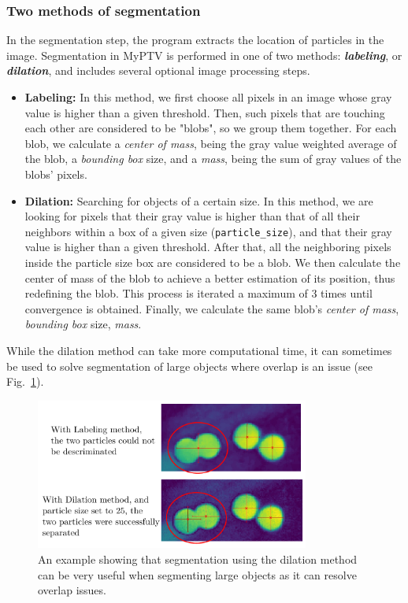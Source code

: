 \documentclass[10pt,a4paper]{article}
\begin{document}
\subsubsection{Two methods of segmentation} In the segmentation step, the program extracts the location of particles in the image. Segmentation in MyPTV is performed in one of two methods: \textbf{\textit{labeling}}, or \textbf{\textit{dilation}}, and includes several optional image processing steps. 
%
\begin{itemize}
	\item \textbf{Labeling:} In this method, we first choose all pixels in an image whose gray value is higher than a given threshold. Then, such pixels that are touching each other are considered to be "blobs", so we group them together. For each blob, we calculate a \textit{center of mass}, being the gray value weighted average of the blob, a \textit{bounding box} size, and a \textit{mass}, being the sum of gray values of the blobs' pixels.
	
	\item \textbf{Dilation:} Searching for objects of a certain size. In this method, we are looking for pixels that their gray value is higher than that of all their neighbors within a box of a given size (\texttt{particle\_size}), and that their gray value is higher than a given threshold. After that, all the neighboring pixels inside the particle size box are considered to be a blob. We then calculate the center of mass of the blob to achieve a better estimation of its position, thus redefining the blob. This process is iterated a maximum of 3 times until convergence is obtained. Finally, we calculate the same blob's \textit{center of mass}, \textit{bounding box} size, \textit{mass}.
\end{itemize}
%
While the dilation method can take more computational time, it can sometimes be used to solve segmentation of large objects where overlap is an issue (see Fig.~\ref{fig:Labeling_vs_Dilation}). 


\begin{figure}[h!]
	\centering
	\includegraphics[width=9cm]{Labeling_vs_Dilation.pdf}
	\caption{An example showing that segmentation using the dilation method can be very useful when segmenting large objects as it can resolve overlap issues.\label{fig:Labeling_vs_Dilation}}
\end{figure}
\end{document}

